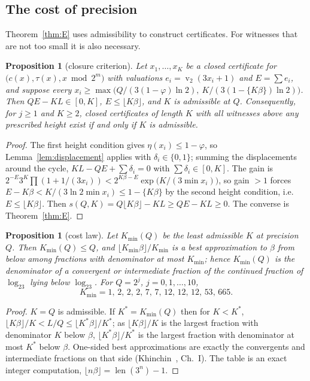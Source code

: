 \documentclass[11pt]{article}
\newtheorem{proposition}[theorem]{Proposition}
\theoremstyle{definition}
\theoremstyle{remark}
\newcommand{\bitlen}{\operatorname{len}}
\DeclareMathOperator{\vv}{v}
\begin{document}
\subsection*{The cost of precision}

Theorem~\ref{thm:E} uses admissibility to construct certificates. For
witnesses that are not too small it is also necessary.

\begin{proposition}[closure criterion]\label{prop:cost}
Let $x_1,\dots,x_K$ be a closed certificate for
$\bigl(c(x),\tau(x),x\bmod2^{m}\bigr)$ with valuations
$e_i=\vv_2(3x_i+1)$ and $E=\sum e_i$, and suppose every
$x_i\ge\max\bigl(Q/(3(1-\varphi)\ln2),\ K/(3(1-\{K\beta\})\ln2)\bigr)$.
Then $QE-KL\in[0,K]$, $E\le\lfloor K\beta\rfloor$, and $K$ is admissible
at $Q$. Consequently, for $j\ge1$ and $K\ge2$, closed certificates of
length $K$ with all witnesses above any prescribed height exist if and
only if $K$ is admissible.
\end{proposition}

\begin{proof}
The first height condition gives $\eta(x_i)\le1-\varphi$, so
Lemma~\ref{lem:displacement} applies with $\delta_i\in\{0,1\}$; summing
the displacements around the cycle, $KL-QE+\sum\delta_i=0$ with
$\sum\delta_i\in[0,K]$. The gain is
$2^{-E}3^{K}\prod(1+1/(3x_i))<2^{K\beta-E}\exp\bigl(K/(3\min x_i)\bigr)$,
so gain $>1$ forces $E-K\beta<K/(3\ln2\min x_i)\le1-\{K\beta\}$ by the
second height condition, i.e.\ $E\le\lfloor K\beta\rfloor$. Then
$s(Q,K)=Q\lfloor K\beta\rfloor-KL\ge QE-KL\ge0$. The converse is
Theorem~\ref{thm:E}.
\end{proof}

\begin{proposition}[cost law]\label{prop:costlaw}
Let $K_{\min}(Q)$ be the least admissible $K$ at precision $Q$. Then
$K_{\min}(Q)\le Q$, and $\lfloor K_{\min}\beta\rfloor/K_{\min}$ is a best
approximation to $\beta$ from below among fractions with denominator at
most $K_{\min}$; hence $K_{\min}(Q)$ is the denominator of a convergent
or intermediate fraction of the continued fraction of $\log_23$ lying
below $\log_23$. For $Q=2^{j}$, $j=0,1,\dots,10$,
\[
K_{\min}=1,\,2,\,2,\,2,\,7,\,7,\,12,\,12,\,12,\,53,\,665 .
\]
\end{proposition}

\begin{proof}
$K=Q$ is admissible. If $K^{*}=K_{\min}(Q)$ then for $K<K^{*}$,
$\lfloor K\beta\rfloor/K<L/Q\le\lfloor K^{*}\beta\rfloor/K^{*}$; as
$\lfloor K\beta\rfloor/K$ is the largest fraction with denominator $K$
below $\beta$, $\lfloor K^{*}\beta\rfloor/K^{*}$ is the largest fraction
with denominator at most $K^{*}$ below $\beta$. One-sided best
approximations are exactly the convergents and intermediate fractions on
that side (Khinchin~\cite{Khinchin1964}, Ch.~I). The table is an exact
integer computation, $\lfloor n\beta\rfloor=\bitlen(3^{n})-1$.
\end{proof}
\end{document}
